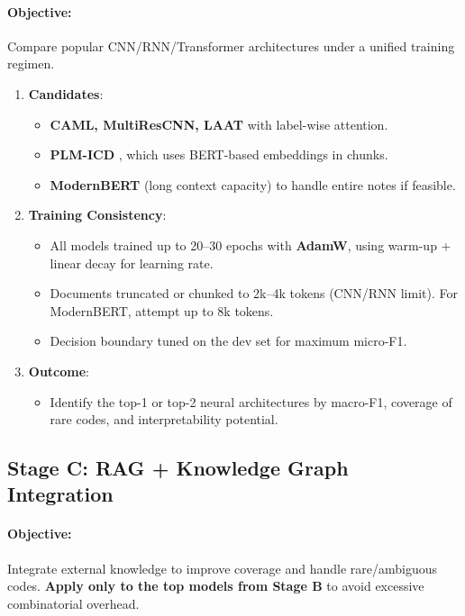 \paragraph{Objective:} Compare popular CNN/RNN/Transformer architectures under a unified training regimen.

\begin{enumerate}
    \item \textbf{Candidates}:
    \begin{itemize}
        \item \textbf{CAML, MultiResCNN, LAAT} \cite{mullenbach2018explainable,li2020multi,vu2020label} with label-wise attention.
        \item \textbf{PLM-ICD} \cite{huang2022plm}, which uses BERT-based embeddings in chunks.
        \item \textbf{ModernBERT} (long context capacity) to handle entire notes if feasible.
    \end{itemize}
    \item \textbf{Training Consistency}:
    \begin{itemize}
        \item All models trained up to 20--30 epochs with \textbf{AdamW}, using warm-up + linear decay for learning rate.
        \item Documents truncated or chunked to 2k--4k tokens (CNN/RNN limit). For ModernBERT, attempt up to 8k tokens.
        \item Decision boundary tuned on the dev set for maximum micro-F1.
    \end{itemize}
    \item \textbf{Outcome}:
    \begin{itemize}
        \item Identify the top-1 or top-2 neural architectures by macro-F1, coverage of rare codes, and interpretability potential.
    \end{itemize}
\end{enumerate}


\subsection{Stage C: RAG + Knowledge Graph Integration}
\paragraph{Objective:} Integrate external knowledge to improve coverage and handle rare/ambiguous codes. \textbf{Apply only to the top models from Stage B} to avoid excessive combinatorial overhead.

